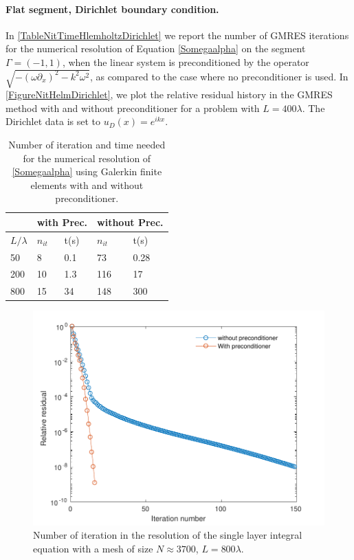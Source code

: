 \documentclass[a4paper]{article}
\begin{document}
\paragraph{Flat segment, Dirichlet boundary condition.} In \autoref{TableNitTimeHlemholtzDirichlet} we report the number of GMRES iterations for the numerical resolution of Equation \eqref{Somegaalpha} on the segment $\Gamma = (-1,1)$, when the linear system is preconditioned by the operator $\sqrt{-(\omega \partial_x)^2 - k^2 \omega^2}$, as compared to the case where no preconditioner is used.  In \autoref{FigureNitHelmDirichlet}, we plot the relative residual history in the GMRES method with and without preconditioner for a problem with $L = 400 \lambda$. The Dirichlet data is set to $u_D(x) = e^{ikx}$. 
\begin{table}[H]
	\begin{center}
		\begin{tabular}{|| m{4em} | m{4em} | m{4em} | m{4em} | m{4em}||} 
			\hline
			\multicolumn{1}{||c|}{ }&
			\multicolumn{2}{c|}{with Prec.}&\multicolumn{2}{c||}{without Prec.}\\
			\hline
			$L/\lambda$ & $n_{it}$& t(s) & $n_{it}$ & t(s)\\
			\hline\hline
			50 & 8 & 0.1 & 73 & 0.28\\
			\hline
			200 & 10 & 1.3 & 116 & 17\\
			\hline
			800 & 15 & 34 & 148 & 300\\
			\hline
		\end{tabular}
	\end{center}
	\caption{Number of iteration and time needed for the numerical resolution of \eqref{Somegaalpha} using Galerkin finite elements with and without preconditioner.}
	\label{TableNitTimeHlemholtzDirichlet}
\end{table}
\vspace{-1cm}
\begin{figure}[H]
	\centering
	\includegraphics[scale=0.5]{../figs/PrecondDirichletHelmSegPDF}
	\caption{Number of iteration in the resolution of the single layer integral equation with a mesh of size $N \approx 3700$, $L = 800 \lambda$.}
	\label{FigureNitHelmDirichlet}
\end{figure}
\end{document}
